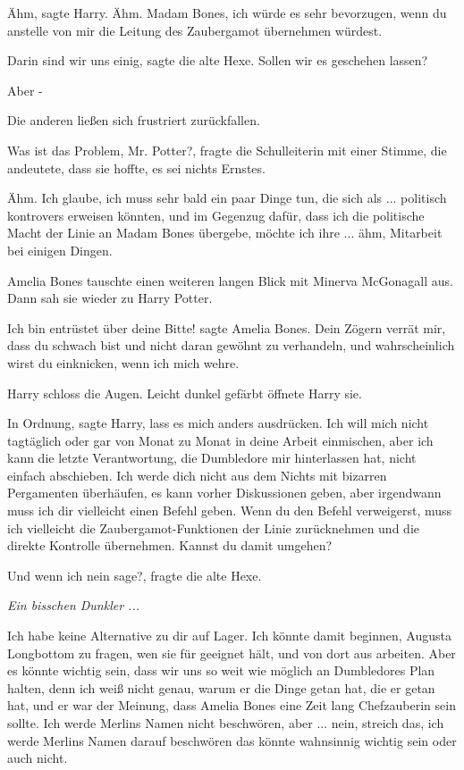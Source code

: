 \glqq{}Ähm\grqq{}, sagte Harry. \glqq{}Ähm. Madam Bones, ich würde es sehr
bevorzugen, wenn du anstelle von mir die Leitung des Zaubergamot übernehmen
würdest.\grqq{}

\glqq{}Darin sind wir uns einig\grqq{}, sagte die alte Hexe. \glqq{}Sollen wir es
geschehen lassen?\grqq{}

\glqq{}Aber -\grqq{}

Die anderen ließen sich frustriert zurückfallen.

\glqq{}Was ist das Problem, Mr. Potter?\grqq{}, fragte die Schulleiterin mit
einer Stimme, die andeutete, dass sie hoffte, es sei nichts Ernstes.

\glqq{}Ähm. Ich glaube, ich muss sehr bald ein paar Dinge tun, die sich als ...
politisch kontrovers erweisen könnten, und im Gegenzug dafür, dass ich die
politische Macht der Linie an Madam Bones übergebe, möchte ich ihre ... ähm,
Mitarbeit bei einigen Dingen.\grqq{}

Amelia Bones tauschte einen weiteren langen Blick mit Minerva McGonagall aus.
Dann sah sie wieder zu Harry Potter.

\glqq{}Ich bin entrüstet über deine Bitte!\grqq{} sagte Amelia Bones. \glqq{}Dein
Zögern verrät mir, dass du schwach bist und nicht daran gewöhnt zu verhandeln,
und wahrscheinlich wirst du einknicken, wenn ich mich wehre.\grqq{}

Harry schloss die Augen. Leicht dunkel gefärbt öffnete Harry sie.

\glqq{}In Ordnung\grqq{}, sagte Harry, \glqq{}lass es mich anders ausdrücken. Ich
will mich nicht tagtäglich oder gar von Monat zu Monat in deine Arbeit
einmischen, aber ich kann die letzte Verantwortung, die Dumbledore mir
hinterlassen hat, nicht einfach abschieben. Ich werde dich nicht aus dem Nichts
mit bizarren Pergamenten überhäufen, es kann vorher Diskussionen geben, aber
irgendwann muss ich dir vielleicht einen Befehl geben. Wenn du den Befehl
verweigerst, muss ich vielleicht die Zaubergamot-Funktionen der Linie
zurücknehmen und die direkte Kontrolle übernehmen. Kannst du damit umgehen?\grqq{}

\glqq{}Und wenn ich nein sage?\grqq{}, fragte die alte Hexe.

\emph{Ein bisschen Dunkler ...}

\glqq{}Ich habe keine Alternative zu dir auf Lager. Ich könnte damit beginnen,
Augusta Longbottom zu fragen, wen sie für geeignet hält, und von dort aus
arbeiten. Aber es könnte wichtig sein, dass wir uns so weit wie möglich an
Dumbledores Plan halten, denn ich weiß nicht genau, warum er die Dinge getan
hat, die er getan hat, und er war der Meinung, dass Amelia Bones eine Zeit lang
Chefzauberin sein sollte. Ich werde Merlins Namen nicht beschwören, aber ...
nein, streich das, ich werde Merlins Namen darauf beschwören das könnte
wahnsinnig wichtig sein oder auch nicht.\grqq{}


